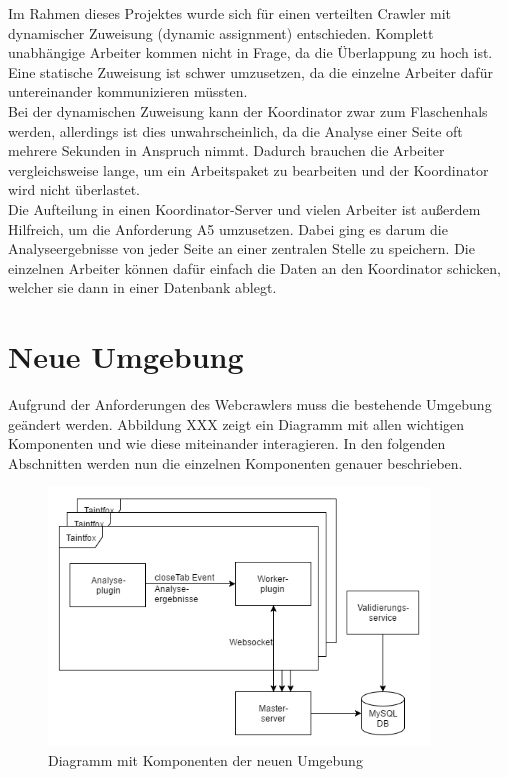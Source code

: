 Im Rahmen dieses Projektes wurde sich für einen verteilten Crawler mit dynamischer Zuweisung (dynamic assignment) entschieden. Komplett unabhängige Arbeiter kommen nicht in Frage, da die Überlappung zu hoch ist. Eine statische Zuweisung ist schwer umzusetzen, da die einzelne Arbeiter dafür untereinander kommunizieren müssten. \\
Bei der dynamischen Zuweisung kann der Koordinator zwar zum Flaschenhals werden, allerdings ist dies unwahrscheinlich, da die Analyse einer Seite oft mehrere Sekunden in Anspruch nimmt. Dadurch brauchen die Arbeiter vergleichsweise lange, um ein Arbeitspaket zu bearbeiten und der Koordinator wird nicht überlastet. \\
Die Aufteilung in einen Koordinator-Server und vielen Arbeiter ist außerdem Hilfreich, um die Anforderung A5 umzusetzen. Dabei ging es darum die Analyseergebnisse von jeder Seite an einer zentralen Stelle zu speichern. Die einzelnen Arbeiter können dafür einfach die Daten an den Koordinator schicken, welcher sie dann in einer Datenbank ablegt.


\section{Neue Umgebung}
Aufgrund der Anforderungen des Webcrawlers muss die bestehende Umgebung geändert werden. Abbildung XXX zeigt ein Diagramm mit allen wichtigen Komponenten und wie diese miteinander interagieren. In den folgenden Abschnitten werden nun die einzelnen Komponenten genauer beschrieben.

\begin{figure}
	\centering
	\includegraphics[width=0.9\textwidth]{Bilder/NeueUmgebung.png}
	\caption{Diagramm mit Komponenten der neuen Umgebung}
\end{figure}

